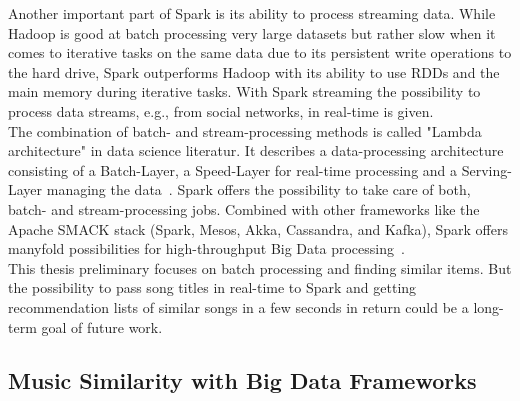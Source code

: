 \noindent Another important part of Spark is its ability to process streaming data. While Hadoop is good at batch processing very large datasets but rather slow when it comes to iterative tasks on the same data due to its persistent write operations to the hard drive, Spark outperforms Hadoop with its ability to use RDDs and the main memory during iterative tasks. 
With Spark streaming the possibility to process data streams, e.g., from social networks, in real-time is given.\\
The combination of batch- and stream-processing methods is called "Lambda architecture" in data science literatur. It describes a data-processing architecture consisting of a Batch-Layer, a Speed-Layer for real-time processing and a Serving-Layer managing the data~\cite[pp. 8 f]{nextgenbig}. Spark offers the possibility to take care of both, batch- and stream-processing jobs. Combined with other frameworks like the Apache SMACK stack (Spark, Mesos, Akka, Cassandra, and Kafka), Spark offers manyfold possibilities for high-throughput Big Data processing~\cite[p. 5]{smack}.\\
This thesis preliminary focuses on batch processing and finding similar items. But the possibility to pass song titles in real-time to Spark and getting recommendation lists of similar songs in a few seconds in return could be a long-term goal of future work.\\

\subsection{Music Similarity with Big Data Frameworks}

